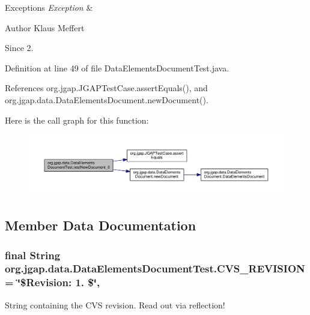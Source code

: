\begin{DoxyExceptions}{Exceptions}
{\em Exception} & \\
\hline
\end{DoxyExceptions}
\begin{DoxyAuthor}{Author}
Klaus Meffert 
\end{DoxyAuthor}
\begin{DoxySince}{Since}
2. 
\end{DoxySince}


Definition at line 49 of file Data\-Elements\-Document\-Test.\-java.



References org.\-jgap.\-J\-G\-A\-P\-Test\-Case.\-assert\-Equals(), and org.\-jgap.\-data.\-Data\-Elements\-Document.\-new\-Document().



Here is the call graph for this function\-:
\nopagebreak
\begin{figure}[H]
\begin{center}
\leavevmode
\includegraphics[width=350pt]{classorg_1_1jgap_1_1data_1_1_data_elements_document_test_a5049900567ccf8048bb5d31bdb6b35a3_cgraph}
\end{center}
\end{figure}




\subsection{Member Data Documentation}
\hypertarget{classorg_1_1jgap_1_1data_1_1_data_elements_document_test_adc7856a246c45ef5d0c7339fa1ac0c91}{
\subsubsection[{C\-V\-S\-\_\-\-R\-E\-V\-I\-S\-I\-O\-N}]{\setlength{\rightskip}{0pt plus 5cm}final String org.\-jgap.\-data.\-Data\-Elements\-Document\-Test.\-C\-V\-S\-\_\-\-R\-E\-V\-I\-S\-I\-O\-N = \char`\"{}\$Revision\-: 1. \$\char`\"{}\hspace{0.3cm}{\ttfamily [static]}, {\ttfamily [private]}}}\label{classorg_1_1jgap_1_1data_1_1_data_elements_document_test_adc7856a246c45ef5d0c7339fa1ac0c91}
String containing the C\-V\-S revision. Read out via reflection! 

